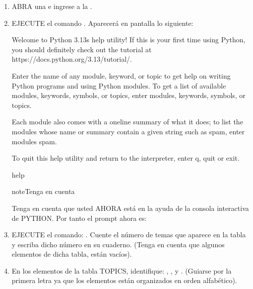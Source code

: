 \documentclass[letterpaper,10pt,spanish]{sphinxmanual}
\begin{document}
\begin{enumerate}
%
\item {} 
\sphinxAtStartPar
ABRA una  e ingrese a la .

\item {} 
\sphinxAtStartPar
EJECUTE el comando . Aparecerá en pantalla lo siguiente:

\begin{sphinxVerbatim}[commandchars=\\\{\}]
\PYGZgt{}\PYGZgt{}\PYGZgt{} Welcome to Python 3.13\PYGZsq{}s help utility! If this is your first time using
Python, you should definitely check out the tutorial at
https://docs.python.org/3.13/tutorial/.

Enter the name of any module, keyword, or topic to get help on writing
Python programs and using Python modules.  To get a list of available
modules, keywords, symbols, or topics, enter \PYGZdq{}modules\PYGZdq{}, \PYGZdq{}keywords\PYGZdq{},
\PYGZdq{}symbols\PYGZdq{}, or \PYGZdq{}topics\PYGZdq{}.

Each module also comes with a one\PYGZhy{}line summary of what it does; to list
the modules whose name or summary contain a given string such as \PYGZdq{}spam\PYGZdq{},
enter \PYGZdq{}modules spam\PYGZdq{}.

To quit this help utility and return to the interpreter,
enter \PYGZdq{}q\PYGZdq{}, \PYGZdq{}quit\PYGZdq{} or \PYGZdq{}exit\PYGZdq{}.

help\PYGZgt{}
\end{sphinxVerbatim}

\begin{sphinxadmonition}{note}{Tenga en cuenta}

\sphinxAtStartPar
Tenga en cuenta que usted AHORA está en la ayuda de la consola interactiva de PYTHON. Por tanto el prompt ahora es:
\end{sphinxadmonition}

\item {} 
\sphinxAtStartPar
EJECUTE el comando: . Cuente el número de temas que aparece en la tabla y escriba dicho número en su cuaderno. (Tenga en cuenta que algunos elementos de dicha tabla, están vacíos).

\item {} 
\sphinxAtStartPar
En los elementos de la tabla TOPICS, identifique: , ,  y . (Guiarse por la primera letra ya que los elementos están organizados en orden alfabético).


\end{enumerate}
\end{document}
